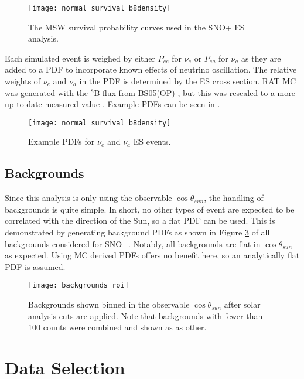 \begin{figure}
\centering
\texttt{[image: normal\_survival\_b8density]}
\caption{The MSW survival probability curves used in the SNO+ ES analysis.}
\label{fig:solar:msw}
\end{figure}

Each simulated event is weighed by either $P_{ee}$ for $\nu_e$ or $P_{ea}$ for $\nu_a$ as they are added to a PDF to incorporate known effects of neutrino oscillation.
The relative weights of $\nu_e$ and $\nu_a$ in the PDF is determined by the ES cross section.
RAT MC was generated with the $^8$B flux from BS05(OP) \cite{bs05op}, but this was rescaled to a more up-to-date measured value \cite{GlobalSolarFlux}.
Example PDFs can be seen in .

\begin{figure}
\centering
\texttt{[image: normal\_survival\_b8density]}
\caption{Example PDFs for $\nu_e$ and $\nu_a$ ES events.}
\label{fig:solar:pdfs}
\end{figure}

\subsection{Backgrounds}

Since this analysis is only using the observable $\cos{\theta_{sun}}$, the handling of backgrounds is quite simple.
In short, no other types of event are expected to be correlated with the direction of the Sun, so a flat PDF can be used.
This is demonstrated by generating background PDFs as shown in Figure \ref{fig:solar:backgrounds} of all backgrounds considered for SNO+.
Notably, all backgrounds are flat in $\cos{\theta_{sun}}$ as expected.
Using MC derived PDFs offers no benefit here, so an analytically flat PDF is assumed.

\begin{figure}
\centering
\texttt{[image: backgrounds\_roi]}
\caption{Backgrounds shown binned in the observable $\cos{\theta_{sun}}$ after solar analysis cuts are applied.
Note that backgrounds with fewer than 100 counts were combined and shown as as other.}
\label{fig:solar:backgrounds}
\end{figure}

\section{Data Selection}

